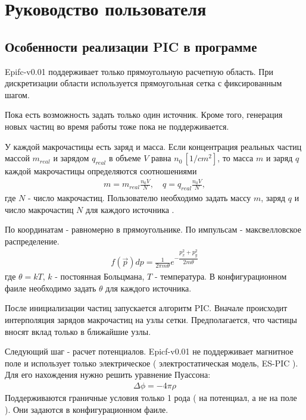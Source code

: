 \section{Руководство пользователя}

\subsection{ Особенности реализации PIC в программе \prognv }

Epifc-v0.01 поддерживает только прямоугольную расчетную область. 
При дискретизации области используется прямоугольная сетка с фиксированным шагом.


Пока есть возможность задать только один источник.
Кроме того, генерация новых частиц во время работы тоже пока не поддерживается.

У каждой макрочастицы есть заряд и масса. 
Если концентрация реальных частиц
массой $m_{real}$ и зарядом $q_{real}$
в объеме $V$ равна $n_0\, [1/cm^2]$, 
то масса $m$ и заряд $q$ каждой макрочастицы определяются соотношениями
\begin{gather}
  m = m_{real} \frac{ n_0 V }{ N },
  \quad
  q = q_{real} \frac{ n_0 V }{ N },
\end{gather}
где $N$ - число макрочастиц.
Пользователю необходимо задать массу $m$, заряд $q$ и число макрочастиц $N$
для каждого источника .

По координатам - равномерно в прямоугольнике.
По импульсам - максвелловское распределение.
\begin{gather}
  f( \vec{p} ) dp = \frac{1}{ 2 \pi m \theta } e^{ - \dfrac{ p_x^2 + p_y^2 }{ 2 m \theta } }
\end{gather}
где $\theta = k T$, $k$ - постоянная Больцмана, $T$ - температура.
В конфигурационном фаиле необходимо задать $\theta$ для каждого источника.


После инициализации частиц запускается алгоритм PIC. 
Вначале происходит интерполяция зарядов макрочастиц на узлы сетки.
Предполагается, что частицы вносят вклад только в ближайшие узлы. 


Следующий шаг - расчет потенциалов. 
Epicf-v0.01 не поддерживает магнитное поле
и использует только электрическое ( электростатическая модель, ES-PIC ).
Для его нахождения нужно решить уравнение Пуассона:
\begin{gather}
  \Delta \phi = - 4 \pi \rho
\end{gather}
Поддерживаются граничные условия только 1 рода ( на потенциал, а не на поле ).
Они задаются в конфигурационном фаиле.

